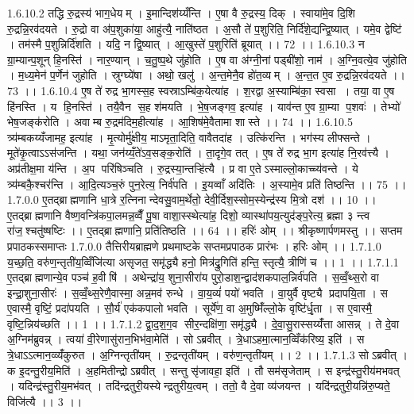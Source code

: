 1.6.10.2
तद्धि रु॒द्रस्य॑ भाग॒धेयम् । इ॒मान्दिश॑य्यँन्ति । ए॒षा वै रु॒द्रस्य॒ दिक् । स्वाया॑मे॒व दि॒शि रु॒द्रन्नि॒रव॑दयते । रु॒द्रो वा अ॑प॒शुका॑या॒ आहु॑त्यै॒ नाति॑ष्ठत । अ॒सौ ते॑ प॒शुरिति॒ निर्दि॑शे॒द्यन्द्वि॒ष्यात् । यमे॒व द्वेष्टि॑ । तम॑स्मै प॒शुन्निर्दि॑शति । यदि॒ न द्वि॒ष्यात् । आ॒खुस्ते॑ प॒शुरिति॑ ब्रूयात् ।। 72 ।।
1.6.10.3
न ग्रा॒म्यान्प॒शून् हि॒नस्ति॑ । नार॒ण्यान् । च॒तु॒ष्प॒थे जु॑होति । ए॒ष वा अ॑ग्नी॒नां पड्बी॑शो॒ नाम॑ । अ॒ग्नि॒वत्ये॒व जु॑होति । म॒ध्य॒मेन॑ प॒र्णेन॑ जुहोति । स्रुग्घ्ये॑षा । अथो॒ खलु॑ । अ॒न्त॒मेनै॒व हो॑त॒व्यम् । अ॒न्त॒त ए॒व रु॒द्रन्नि॒रव॑दयते ।। 73 ।।
1.6.10.4
ए॒ष ते॑ रुद्र भा॒गस्स॒ह स्वस्राऽम्बि॑क॒येत्या॑ह । श॒रद्वा अ॒स्याम्बि॑का॒ स्वसा । तया॒ वा ए॒ष हि॑नस्ति । य हि॒नस्ति॑ । तयै॒वैन॑ स॒ह श॑मयति । भे॒ष॒जङ्गव॒ इत्या॑ह । याव॑न्त ए॒व ग्रा॒म्या प॒शवः॑ । तेभ्यो॑ भेष॒जङ्क॑रोति । अवाम्ब रु॒द्रम॑दिम॒हीत्या॑ह । आ॒शिष॑मे॒वैतामा शास्ते ।। 74 ।।
1.6.10.5
त्र्य॑म्बकय्यँजामह॒ इत्या॑ह । मृ॒त्योर्मु॑क्षीय॒ माऽमृता॒दिति॒ वावैतदा॑ह । उत्कि॑रन्ति । भग॑स्य लीफ्सन्ते । मूते॑कृ॒त्वाऽऽस॑जन्ति । यथा॒ जन॑य्यँ॒ते॑ऽव॒सङ्क॒रोति॑ । ता॒दृगे॒व तत् । ए॒ष ते॑ रुद्र भा॒ग इत्या॑ह नि॒रव॑त्त्यै । अप्र॑तीक्ष॒मा य॑न्ति । अ॒प परि॑षिञ्चति । रु॒द्रस्या॒न्तऱ्हि॑त्यै । प्र वा ए॒तेऽस्माल्लो॒काच्च्य॑वन्ते । ये त्र्य॑म्बकै॒श्चर॑न्ति । आ॒दि॒त्यञ्च॒रुं पुन॒रेत्य॒ निर्व॑पति । इ॒यव्वाँ अदि॑तिः । अ॒स्यामे॒व प्रति॑ तिष्ठन्ति ।। 75 ।।
1.7.0.0
ए॒तद्ब्राह्मणानि धा॒त्रे र॒त्निनान्देवसु॒वाम॒र्थेतो॒ देवी॒र्दिश॒स्सोम॒स्येन्द्र॑स्य मि॒त्रो दश॑ ।। 10 ।। ए॒तद्ब्राह्मणानि वैष्ण॒वन्त्रि॑कपा॒लमन्न॒व्वैँ पू॒षा वाशा॒स्स्थेत्या॑ह॒ दिशो॒ व्यास्था॑पय॒त्युद॑ङ्प॒रेत्य॒ ब्रह्मा ३ न्त्व रा॑ज॒॒श्चतु॑ष्षष्टिः ।। ए॒तद्ब्राह्मणानि॒ प्रति॑तिष्ठति ।। 64 ।। हरिः॑ ओम् ।। श्रीकृष्णार्पणमस्तु ।। सप्तम प्रपाठकस्समाप्तः
1.7.0.0
तैत्तिरीयब्राह्मणे प्रथमाष्टके सप्तमप्रपाठक प्रारंभः । हरिः ओम् ।।
1.7.1.0
य॒च्छ॒ति॒ वरु॑ण॒न्तृती॑य॒व्विँजि॑त्या असृजत॒ समृ॑द्ध्यै हनो॒ मित्र॑द्रु॒गिति॑ हन्ति॒ स्तृत्यै॒ त्रीणि॑ च ।। 1 ।।
1.7.1.1
ए॒तद्ब्राह्मणान्ये॒व पञ्च॑ ह॒वीषि॑ । अथेन्द्रा॑य॒ शुना॒सीरा॑य पुरो॒डाश॒न्द्वाद॑शकपाल॒न्निर्व॑पति । स॒व्वँ॒थ्स॒रो वा इन्द्रा॒शुना॒सीरः॑ । स॒व्वँ॒थ्स॒रेणै॒वास्मा॒ अन्न॒मव॑ रुन्धे । वा॒य॒व्यं॑ पयो॑ भवति । वा॒युर्वै वृष्ट्यै प्रदापयि॒ता । स ए॒वास्मै॒ वृष्टिं॒ प्रदा॑पयति । सौ॒र्य॑ एक॑कपालो भवति । सूर्ये॑ण॒ वा अ॒मुष्मिँ॑ल्लो॒के वृष्टि॑र्धृ॒ता । स ए॒वास्मै॒ वृष्टि॒न्निय॑च्छति ।। 1 ।।
1.7.1.2
द्वा॒द॒श॒ग॒व सीर॒न्दक्षि॑णा॒ समृ॑द्ध्यै । दे॒वा॒सु॒रास्सय्यँ॑त्ता आसन्न् । ते दे॒वा अ॒ग्निम॑ब्रुवन्न् । त्वया॑ वी॒रेणासु॑रान॒भिभ॑वा॒मेति॑ । सोऽब्रवीत् । त्रे॒धाऽहमा॒त्मान॒व्विँक॑रिष्य॒ इति॑ । स त्रे॒धाऽऽत्मान॒व्व्यँ॑कुरुत । अ॒ग्निन्तृती॑यम् । रु॒द्रन्तृती॑यम् । वरु॑ण॒न्तृती॑यम् ।। 2 ।।
1.7.1.3
सोऽब्रवीत् । क इ॒दन्तु॒रीय॒मिति॑ । अ॒हमितीन्द्रोऽब्रवीत् । सन्तु सृ॑जावहा॒ इति॑ । तौ सम॑सृजेताम् । स इन्द्र॑स्तु॒रीय॑मभवत् । यदिन्द्र॑स्तु॒रीय॒मभ॑वत् । तदि॑न्द्रतुरी॒यस्येन्द्रतुरीय॒त्वम् । ततो॒ वै दे॒वा व्य॑जयन्त । यदि॑न्द्रतुरी॒यन्नि॑रु॒प्यते॒ विजि॑त्यै ।। 3 ।।
